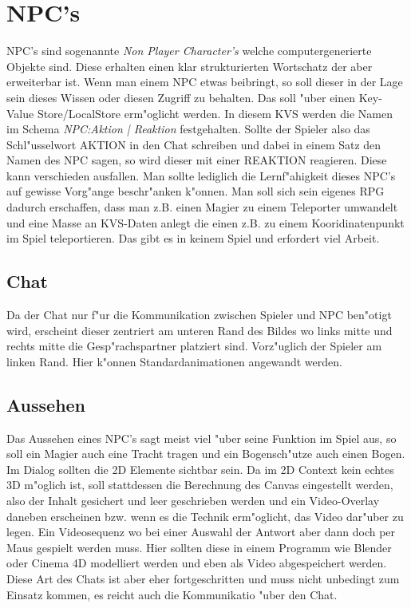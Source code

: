 \documentclass[14pt]{book}
\begin{document}
\section{NPC's}

NPC's sind sogenannte \emph{Non Player Character's} welche computergenerierte Objekte sind. Diese erhalten einen klar strukturierten Wortschatz der aber erweiterbar ist. Wenn man einem NPC etwas beibringt, so soll dieser in der Lage sein dieses Wissen oder diesen Zugriff zu behalten. Das soll "uber einen Key-Value Store/LocalStore erm"oglicht werden. In diesem KVS werden die Namen im Schema \emph{NPC:Aktion | Reaktion} festgehalten. Sollte der Spieler also das Schl"usselwort AKTION in den Chat schreiben und dabei in einem Satz den Namen des NPC sagen, so wird dieser mit einer REAKTION reagieren. Diese kann verschieden ausfallen. Man sollte lediglich die Lernf"ahigkeit dieses NPC's auf gewisse Vorg"ange beschr"anken k"onnen. Man soll sich sein eigenes RPG dadurch erschaffen, dass man z.B. einen Magier zu einem Teleporter umwandelt und eine Masse an KVS-Daten anlegt die einen z.B. zu einem Kooridinatenpunkt im Spiel teleportieren. Das gibt es in keinem Spiel und erfordert viel Arbeit.

\subsection{Chat}

Da der Chat nur f"ur die Kommunikation zwischen Spieler und NPC ben"otigt wird, erscheint dieser zentriert am unteren Rand des Bildes wo links mitte und rechts mitte die Gesp"rachspartner platziert sind. Vorz"uglich der Spieler am linken Rand. Hier k"onnen Standardanimationen angewandt werden.

\subsection{Aussehen}

Das Aussehen eines NPC's sagt meist viel "uber seine Funktion im Spiel aus, so soll ein Magier auch eine Tracht tragen und ein Bogensch"utze auch einen Bogen. Im Dialog sollten die 2D Elemente sichtbar sein. Da im 2D Context kein echtes 3D m"oglich ist, soll stattdessen die Berechnung des Canvas eingestellt werden, also der Inhalt gesichert und leer geschrieben werden und ein Video-Overlay daneben erscheinen bzw. wenn es die Technik erm"oglicht, das Video dar"uber zu legen. Ein Videosequenz wo bei einer Auswahl der Antwort aber dann doch per Maus gespielt werden muss. Hier sollten diese in einem Programm wie Blender oder Cinema 4D modelliert werden und eben als Video abgespeichert werden. Diese Art des Chats ist aber eher fortgeschritten und muss nicht unbedingt zum Einsatz kommen, es reicht auch die Kommunikatio "uber den Chat.
\end{document}
